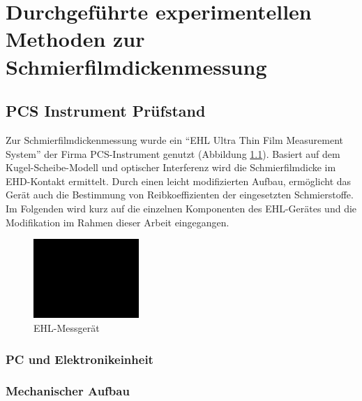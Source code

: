 \chapter{Durchgeführte experimentellen Methoden zur Schmierfilmdickenmessung}
\label{chap:durchgefuehrte_experimentellen_methoden}

\section{PCS Instrument Prüfstand}
\label{sec:pcs_pruefstand}

Zur Schmierfilmdickenmessung wurde ein ``EHL Ultra Thin Film Measurement System'' der Firma PCS-Instrument genutzt (Abbildung \ref{fig:ehl_messgeraet}).
Basiert auf dem Kugel-Scheibe-Modell und optischer Interferenz wird die Schmierfilmdicke im EHD-Kontakt ermittelt.
Durch einen leicht modifizierten Aufbau, ermöglicht das Gerät auch die Bestimmung von Reibkoeffizienten der eingesetzten Schmierstoffe.
Im Folgenden wird kurz auf die einzelnen Komponenten des EHL-Gerätes und die Modifikation im Rahmen dieser Arbeit eingegangen.

\begin{figure}[htb]
    \centering
    \includegraphics[width=4cm]{./images/blank_img.jpg}
    \caption{EHL-Messgerät}
    \label{fig:ehl_messgeraet}
\end{figure}

\subsection{PC und Elektronikeinheit}
\label{sub:pc_elektronikeinheit}

\subsection{Mechanischer Aufbau}
\label{sub:mechanischer_aufbau}

